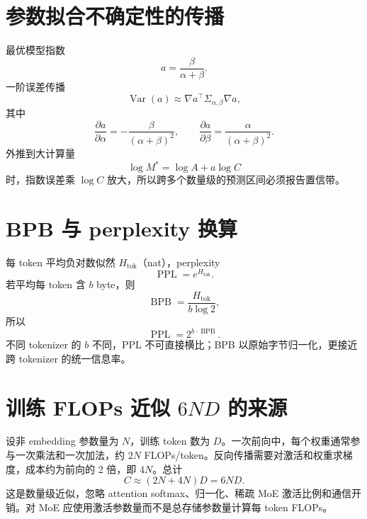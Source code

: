 \documentclass[UTF8,12pt,a4paper,fontset=none]{ctexart}
\numberwithin{equation}{section}
\begin{document}
\section{参数拟合不确定性的传播}
最优模型指数
\begin{equation}
 a=\frac\beta{\alpha+\beta}.
\end{equation}
一阶误差传播
\begin{equation}
 \operatorname{Var}(a)\approx
 \nabla a^\top\Sigma_{\alpha,\beta}\nabla a,
\end{equation}
其中
\begin{equation}
 \frac{\partial a}{\partial\alpha}
 =-\frac\beta{(\alpha+\beta)^2},
 \qquad
 \frac{\partial a}{\partial\beta}
 =\frac\alpha{(\alpha+\beta)^2}.
\end{equation}
外推到大计算量
\begin{equation}
 \log M^*=\log A+a\log C
\end{equation}
时，指数误差乘 $\log C$ 放大，所以跨多个数量级的预测区间必须报告置信带。

\section{BPB 与 perplexity 换算}
每 token 平均负对数似然 $H_{\mathrm{tok}}$（nat），perplexity
\begin{equation}
 \operatorname{PPL}=e^{H_{\mathrm{tok}}}.
\end{equation}
若平均每 token 含 $b$ byte，则
\begin{equation}
 \operatorname{BPB}=\frac{H_{\mathrm{tok}}}{b\log2},
\end{equation}
所以
\begin{equation}
 \operatorname{PPL}=2^{b\cdot\operatorname{BPB}}.
\end{equation}
不同 tokenizer 的 $b$ 不同，PPL 不可直接横比；BPB 以原始字节归一化，更接近跨 tokenizer 的统一信息率。
\clearpage
\section{训练 FLOPs 近似 $6ND$ 的来源}
设非 embedding 参数量为 $N$，训练 token 数为 $D$。一次前向中，每个权重通常参与一次乘法和一次加法，约 $2N$ FLOPs/token。反向传播需要对激活和权重求梯度，成本约为前向的 2 倍，即 $4N$。总计
\begin{equation}
 C\approx(2N+4N)D=6ND.
\end{equation}
这是数量级近似，忽略 attention softmax、归一化、稀疏 MoE 激活比例和通信开销。对 MoE 应使用激活参数量而不是总存储参数量计算每 token FLOPs。
\end{document}
